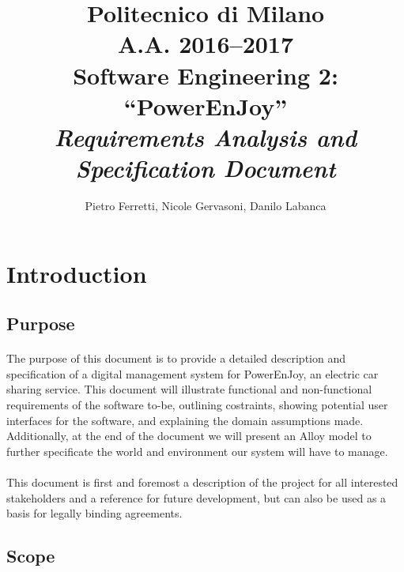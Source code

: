 \documentclass[english]{article}
\begin{document}
\title{Politecnico di Milano\\
 A.A. 2016–2017 \\
Software Engineering 2: “PowerEnJoy” \\
\emph{Requirements Analysis and Specification Document}}

\author{Pietro Ferretti, Nicole Gervasoni, Danilo Labanca}

\maketitle

\newpage

\tableofcontents{}

\newpage

\section{Introduction}

\subsection{Purpose}

\paragraph{}
The purpose of this document is to provide a detailed description and specification of a digital management system for PowerEnJoy, an electric car sharing service. This document will
illustrate functional and non-functional requirements of the software to-be, outlining costraints, showing potential user interfaces for the software, and explaining the domain assumptions made. Additionally, at the end of the document we will present an Alloy model to further specificate the world and environment our system will have to manage.

\paragraph{}
This document is first and foremost a description of the project for all interested stakeholders and a reference for future development, but can also be used as a basis for legally binding agreements.


\subsection{Scope}
\end{document}
